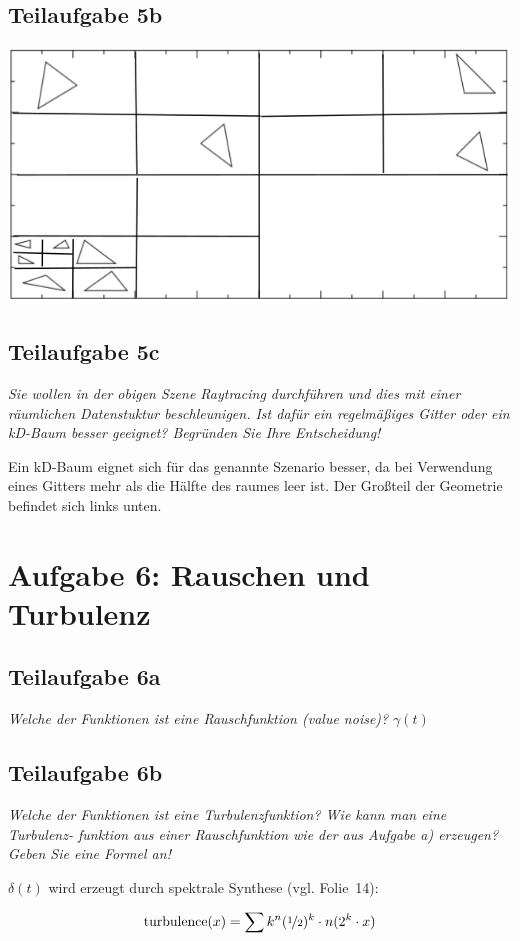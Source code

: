 \documentclass[a4paper]{scrartcl}
\begin{document}
\subsection*{Teilaufgabe 5b}
\includegraphics*[width=0.8\linewidth, keepaspectratio]{5b.png}

\subsection*{Teilaufgabe 5c}
\textit{Sie wollen in der obigen Szene Raytracing durchführen und dies mit einer räumlichen
Datenstuktur beschleunigen. Ist dafür ein regelmäßiges Gitter oder ein kD-Baum besser
geeignet? Begründen Sie Ihre Entscheidung!}

Ein kD-Baum eignet sich für das genannte Szenario besser, da bei Verwendung
eines Gitters mehr als die Hälfte des raumes leer ist. Der Großteil der
Geometrie befindet sich links unten.

\section*{Aufgabe 6: Rauschen und Turbulenz}
\subsection*{Teilaufgabe 6a}
\textit{Welche der Funktionen ist eine Rauschfunktion (value noise)?}
$\gamma(t)$

\subsection*{Teilaufgabe 6b}
\textit{Welche der Funktionen ist eine Turbulenzfunktion? Wie kann man eine Turbulenz-
funktion aus einer Rauschfunktion wie der aus Aufgabe a) erzeugen? Geben Sie eine
Formel an!}

$\delta(t)$ wird erzeugt durch spektrale Synthese (vgl. Folie~14):

\[\text{turbulence}(x) = \sum{k}^n (\nicefrac{1}{2})^k \cdot n(2^k \cdot x)\]
\end{document}

